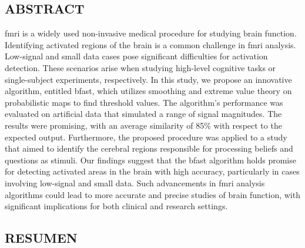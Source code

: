\vspace*{0.5in}
\begin{center}
\section*{ABSTRACT}
\end{center}

\acrfull{fmri} is a widely used non-invasive medical procedure for studying 
brain function. Identifying activated regions of the brain is a common challenge 
in \acrshort{fmri} analysis. Low-signal and small data cases pose significant 
difficulties for activation detection. These scenarios arise when studying 
high-level cognitive tasks or single-subject experiments, respectively. In 
this study, we propose an innovative algorithm, entitled \acrfull{bfast}, 
which utilizes smoothing and extreme value theory on probabilistic maps to 
find threshold values. The algorithm's performance was evaluated on artificial 
data that simulated a range of signal magnitudes. The results were promising, 
with an average similarity of 85\% with respect to the expected output. 
Furthermore, the proposed procedure was applied to a study that aimed to 
identify the cerebral regions responsible for processing beliefs and questions 
as stimuli. Our findings suggest that the \acrshort{bfast} algorithm holds 
promise for detecting activated areas in the brain with high accuracy, 
particularly in cases involving low-signal and small data. Such advancements 
in \acrshort{fmri} analysis algorithms could lead to more accurate and precise 
studies of brain function, with significant implications for both clinical and 
research settings.

\newpage

\vspace*{0.5in}
\begin{center}
\section*{RESUMEN}
\end{center}

